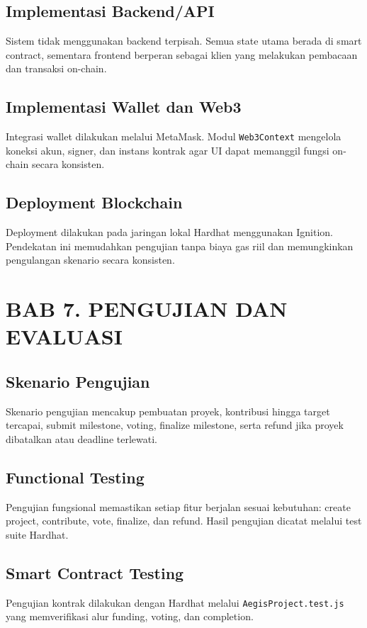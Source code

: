 \documentclass[12pt]{article}
\begin{document}
\subsection{Implementasi Backend/API}
Sistem tidak menggunakan backend terpisah. Semua state utama berada di smart contract, sementara frontend berperan sebagai klien yang melakukan pembacaan dan transaksi on-chain.

\subsection{Implementasi Wallet dan Web3}
Integrasi wallet dilakukan melalui MetaMask. Modul \texttt{Web3Context} mengelola koneksi akun, signer, dan instans kontrak agar UI dapat memanggil fungsi on-chain secara konsisten.

\subsection{Deployment Blockchain}
Deployment dilakukan pada jaringan lokal Hardhat menggunakan Ignition. Pendekatan ini memudahkan pengujian tanpa biaya gas riil dan memungkinkan pengulangan skenario secara konsisten.

\section{BAB 7. PENGUJIAN DAN EVALUASI}
\subsection{Skenario Pengujian}
Skenario pengujian mencakup pembuatan proyek, kontribusi hingga target tercapai, submit milestone, voting, finalize milestone, serta refund jika proyek dibatalkan atau deadline terlewati.

\subsection{Functional Testing}
Pengujian fungsional memastikan setiap fitur berjalan sesuai kebutuhan: create project, contribute, vote, finalize, dan refund. Hasil pengujian dicatat melalui test suite Hardhat.

\subsection{Smart Contract Testing}
Pengujian kontrak dilakukan dengan Hardhat melalui \texttt{AegisProject.test.js} yang memverifikasi alur funding, voting, dan completion.
\end{document}
